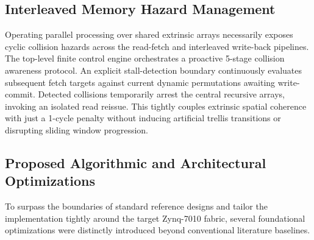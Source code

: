 \documentclass[conference]{IEEEtran}
\begin{document}
\subsection{Interleaved Memory Hazard Management}
Operating parallel processing over shared extrinsic arrays necessarily exposes cyclic collision hazards across the read-fetch and interleaved write-back pipelines. The top-level finite control engine orchestrates a proactive 5-stage collision awareness protocol. An explicit stall-detection boundary continuously evaluates subsequent fetch targets against current dynamic permutations awaiting write-commit. Detected collisions temporarily arrest the central recursive arrays, invoking an isolated read reissue. This tightly couples extrinsic spatial coherence with just a 1-cycle penalty without inducing artificial trellis transitions or disrupting sliding window progression.

\subsection{Proposed Algorithmic and Architectural Optimizations}
To surpass the boundaries of standard reference designs and tailor the implementation tightly around the target Zynq-7010 fabric, several foundational optimizations were distinctly introduced beyond conventional literature baselines.
\end{document}
